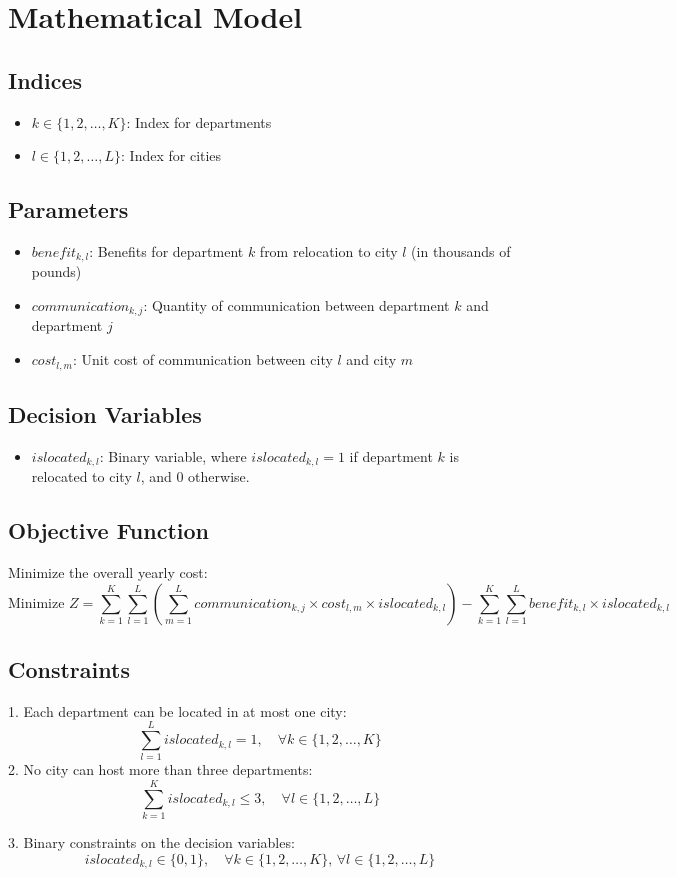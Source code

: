 \documentclass{article}
\begin{document}
\section*{Mathematical Model}

\subsection*{Indices}
\begin{itemize}
    \item $k \in \{1, 2, \ldots, K\}$: Index for departments
    \item $l \in \{1, 2, \ldots, L\}$: Index for cities
\end{itemize}

\subsection*{Parameters}
\begin{itemize}
    \item $benefit_{k, l}$: Benefits for department $k$ from relocation to city $l$ (in thousands of pounds)
    \item $communication_{k, j}$: Quantity of communication between department $k$ and department $j$
    \item $cost_{l, m}$: Unit cost of communication between city $l$ and city $m$
\end{itemize}

\subsection*{Decision Variables}
\begin{itemize}
    \item $islocated_{k, l}$: Binary variable, where $islocated_{k, l} = 1$ if department $k$ is relocated to city $l$, and $0$ otherwise.
\end{itemize}

\subsection*{Objective Function}
Minimize the overall yearly cost:
\[
\text{Minimize } Z = \sum_{k=1}^{K} \sum_{l=1}^{L} \left( \sum_{m=1}^{L} communication_{k, j} \times cost_{l, m} \times islocated_{k, l} \right) - \sum_{k=1}^{K} \sum_{l=1}^{L} benefit_{k, l} \times islocated_{k, l}
\]

\subsection*{Constraints}
1. Each department can be located in at most one city:
\[
\sum_{l=1}^{L} islocated_{k, l} = 1, \quad \forall k \in \{1, 2, \ldots, K\}
\]
2. No city can host more than three departments:
\[
\sum_{k=1}^{K} islocated_{k, l} \leq 3, \quad \forall l \in \{1, 2, \ldots, L\}
\]

3. Binary constraints on the decision variables:
\[
islocated_{k, l} \in \{0, 1\}, \quad \forall k \in \{1, 2, \ldots, K\}, \, \forall l \in \{1, 2, \ldots, L\}
\]
\end{document}
